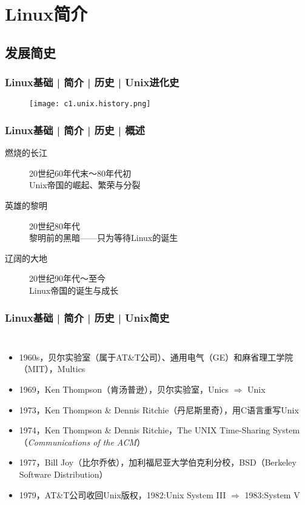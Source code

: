 \section{Linux简介}
\subsection{发展简史}
\begin{frame}
  \frametitle{Linux基础 | 简介 | 历史 | Unix进化史}
  \begin{figure}
    \centering
    \texttt{[image: c1.unix.history.png]}
  \end{figure}
\end{frame}

\begin{frame}
  \frametitle{Linux基础 | 简介 | 历史 | 概述}
  \begin{description}
    \item[燃烧的长江] 20世纪60年代末～80年代初\\Unix帝国的崛起、繁荣与分裂
    \item[英雄的黎明] 20世纪80年代\\黎明前的黑暗——只为等待Linux的诞生
    \item[辽阔的大地] 20世纪90年代～至今\\Linux帝国的诞生与成长
  \end{description}
\end{frame}

\begin{frame}
  \frametitle{Linux基础 | 简介 | 历史 | Unix简史}
  \begin{columns}
  \begin{itemize}[<+->]
    \item 1960s，贝尔实验室（属于AT\&T公司）、通用电气（GE）和麻省理工学院（MIT），Multics
    \item 1969，Ken Thompson（肯\textbullet 汤普逊），贝尔实验室，Unics $\Rightarrow$ Unix
    \item 1973，\alert{Ken Thompson \& Dennis Ritchie}（丹尼斯\textbullet 里奇），用C语言重写\alert{Unix}
    \item 1974，Ken Thompson \& Dennis Ritchie，The UNIX Time-Sharing System（\textit{Communications of the ACM}）
    \item 1977，Bill Joy（比尔\textbullet 乔依），加利福尼亚大学伯克利分校，BSD（Berkeley Software Distribution）
    \item 1979，AT\&T公司收回Unix版权，1982:Unix System III $\Rightarrow$ 1983:System V
  \end{itemize}
    \vspace{0.2cm}
  \end{columns}
\end{frame}

